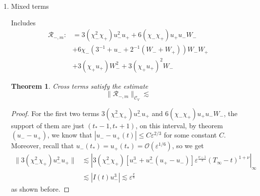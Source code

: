 \documentclass[letterpaper,11pt]{article}
\newcommand{\rmO}{\mathcal{O}}
\newcommand{\eps}{\varepsilon}
\newcommand{\lar}{ \lesssim }
\numberwithin{equation}{section}
\theoremstyle{plain}
\newtheorem{theorem}{Theorem}[section]
\begin{document}
\begin{enumerate}
\begin{itemize}
\begin{enumerate}
\begin{proof}
Finally for the cubic term, 
On $\eps^{-1}\delta<t$, the weight $I(t) = \delta^{\frac{1}{4}}\eps^{\frac{\nu-1}{3}}(T_\infty-t)^{1+\nu}$, it holds that 
\begin{align*}
\|W_-^3\| &\lar \delta^{-\frac{1}{4}}\eps^{\frac{\nu-1}{3}}(T_\infty - t)^{1+\nu}(\delta^{\frac{1}{4}} \eps^{\frac{1-\nu}{3}} (T_\infty - t)^{-\nu})^3 \\
& \lar \delta^{\frac{1}{2}} \eps^{\frac{2-2\nu}{3}} (T_\infty-t)^{1-\nu}(T_\infty-t)^{-\nu} \\
& \lar \delta^{\frac{1}{2}}\eps^{\frac{2(1-\nu)}{3}} \eps^{\frac{\nu-1}{3}} \delta^{\nu}  = \rmO(\eps^{\frac{1-\nu}{3}}).
\end{align*}

And for $0<t<\eps^{-1}\delta$, $I(t) = [\delta^{-\frac{1}{4}}(\delta-\eps t)^{\frac{3}{2}} + \delta^{\frac{1}{4}}\eps^{\frac{2}{3}}]^{-1}$, and $|W_-(t)| \lar \delta^{-\frac{1}{4}}(\delta-\eps t)+\delta^{\frac{1}{4}} \eps^{\frac{1}{3}}$
\begin{align*}
\|W_-(t)^3\| &\lar |I(t)W_-(t)^3| \lar \frac{(\delta^{\frac{3}{4}}\beta + \delta^{\frac{1}{4}}\eps^{\frac{1}{3}} )^3}{\delta^{\frac{5}{4}}\beta^{\frac{3}{2}} +\delta^{\frac{1}{4}}\eps^{\frac{2}{3}} } \\
& \lar \frac{ \delta^{\frac{9}{4}}\beta^3  }{\delta^{\frac{5}{4}}\beta^{\frac{3}{2}}} + \frac{\delta^{\frac{3}{4}}\eps}{\delta^{\frac{1}{4}} \eps^{\frac{2}{3}}}  = \delta \beta^{\frac{3}{2}} + \eps^{\frac{1}{3}}\delta\\
& = \rmO(\delta)
\end{align*}
================================================
\end{proof}

\item Mixed terms

Includes
\begin{align*}
\mathcal{R}_{-,m} :&= 3(\chi_-^2\chi_+) u_-^2 u_+  + 6(\chi_-\chi_+) u_+ u_-W_- \\ 
&+ 6\chi_-(3^{-1}+u_- +2^{-1}(W_-+W_+))W_-W_+
\\ 
&+3(\chi_+u_+)W_-^2 +3(\chi_+u_+)^2W_-  
\end{align*}

\begin{theorem}
Cross terms satisfy the estimate
\[
\|\mathcal{R}_{-,m} \|_{\mathcal{C}_V} \lar 
\]
\end{theorem}
\begin{proof}
For the first two terms $3(\chi_-^2\chi_+)u_-^2u_+$ and $6(\chi_-\chi_+)u_+u_-W_-$, the support of them are just $(t_*-1,t_*+1)$, on this interval, by theorem $(u_--u_+)$, we know that $|u_- - u_+(t)| \le C\eps^{2/3}$ for some constant $C$. Moreover, recall that $u_-(t_*) = u_+(t_*) = \rmO(\eps^{1/6})$, so we get
\begin{align*}
\|3(\chi_-^2\chi_+)u_-^2u_+ \| &\lar | 3(\chi_-^2\chi_+)[u_-^3+u_-^2(u_+ -u_-)]  \eps^{\frac{\nu-1}{3}}(T_\infty -t)^{1+\nu} |_{\infty} \\
& \lar |I(t)u_-^3| \lar \eps^{\frac{\nu}{6}}
\end{align*}
as shown before.


\end{proof}
\end{enumerate}
\end{itemize}
\end{enumerate}
\end{document}
